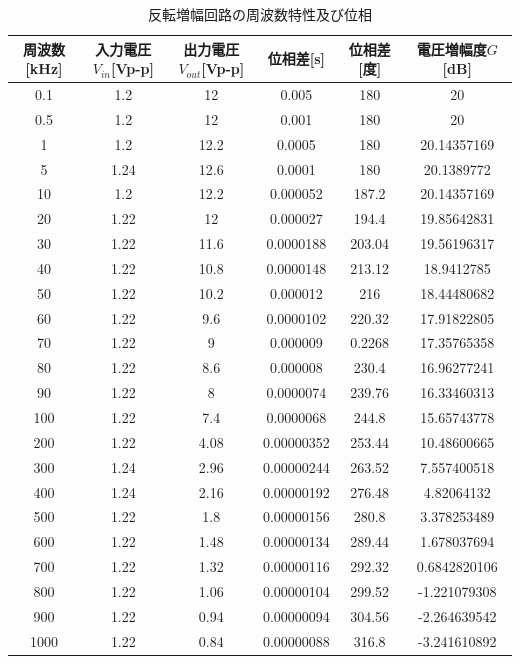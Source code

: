 \documentclass[a4paper,11pt,uplatex]{jsarticle}
\begin{document}
\begin{table}[H]
	\caption{反転増幅回路の周波数特性及び位相}
	\label{周波数特性}
	\begin{center}
    \begin{tabular}[H]{|c|c|c|c|c|c|}\hline
      周波数[kHz] & 入力電圧$V_{in}$[Vp-p] & 出力電圧$V_{out}$[Vp-p] & 位相差[s] & 位相差[度] & 電圧増幅度$G$[dB] \\ \hline
      0.1 & 1.2 & 12 & 0.005 & 180 & 20 \\ \hline
      0.5 & 1.2 & 12 & 0.001 & 180 & 20 \\ \hline
      1 & 1.2 & 12.2 & 0.0005 & 180 & 20.14357169 \\ \hline
      5 & 1.24 & 12.6 & 0.0001 & 180 & 20.1389772 \\ \hline
      10 & 1.2 & 12.2 & 0.000052 & 187.2 & 20.14357169 \\ \hline
      20 & 1.22 & 12 & 0.000027 & 194.4 & 19.85642831 \\ \hline
      30 & 1.22 & 11.6 & 0.0000188 & 203.04 & 19.56196317 \\ \hline
      40 & 1.22 & 10.8 & 0.0000148 & 213.12 & 18.9412785 \\ \hline
      50 & 1.22 & 10.2 & 0.000012 & 216 & 18.44480682 \\ \hline
      60 & 1.22 & 9.6 & 0.0000102 & 220.32 & 17.91822805 \\ \hline
      70 & 1.22 & 9 & 0.000009 & 0.2268 & 17.35765358 \\ \hline
      80 & 1.22 & 8.6 & 0.000008 & 230.4 & 16.96277241 \\ \hline
      90 & 1.22 & 8 & 0.0000074 & 239.76 & 16.33460313 \\ \hline
      100 & 1.22 & 7.4 & 0.0000068 & 244.8 & 15.65743778 \\ \hline
      200 & 1.22 & 4.08 & 0.00000352 & 253.44 & 10.48600665 \\ \hline
      300 & 1.24 & 2.96 & 0.00000244 & 263.52 & 7.557400518 \\ \hline
      400 & 1.24 & 2.16 & 0.00000192 & 276.48 & 4.82064132 \\ \hline
      500 & 1.22 & 1.8 & 0.00000156 & 280.8 & 3.378253489 \\ \hline
      600 & 1.22 & 1.48 & 0.00000134 & 289.44 & 1.678037694 \\ \hline
      700 & 1.22 & 1.32 & 0.00000116 & 292.32 & 0.6842820106 \\ \hline
      800 & 1.22 & 1.06 & 0.00000104 & 299.52 & -1.221079308 \\ \hline
      900 & 1.22 & 0.94 & 0.00000094 & 304.56 & -2.264639542 \\ \hline
      1000 & 1.22 & 0.84 & 0.00000088 & 316.8 & -3.241610892 \\ \hline
    \end{tabular}
\end{center}
\end{table}
\end{document}
